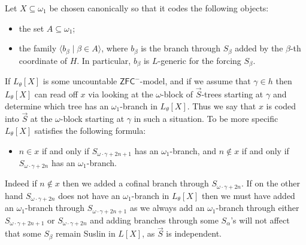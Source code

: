 \documentclass[a4paper,11pt]{article}
\newcommand{\ZFCminus}{\mathsf{ZFC}^{-}}
\begin{document}
Let $X\subseteq\omega_1$ be chosen canonically so that it codes the following
objects:
\begin{itemize}
   \item the set $A\subseteq\omega_1$;
   \item the family $\langle b_\beta\mid\beta\in A\rangle$, where $b_\beta$
         is the branch through $S_\beta$ added by the $\beta$-th coordinate
         of $H$.  In particular, $b_\beta$ is $L$-generic for the forcing
         $S_\beta$.
\end{itemize}

If $L_{\theta}[X]$ is some uncountable $\ZFCminus$-model, and if we assume that $\gamma \in h$ then
 $L_{\theta}[X]$ can read off $x$ via looking at the $\omega$-block of $\vec{S}$-trees starting at $\gamma$ and determine which tree has an $\omega_1$-branch in $L_{\theta}[X]$. Thus  we say that $x$ is coded into $\vec{S}$ at the $\omega$-block starting at $\gamma$ in such a situation. To be more specific $L_{\theta}[X]$ satisfies the following formula:
\begin{itemize}
 \item[$(\ast)_{\gamma, x}$]  $n \in x$ if and only if $S_{\omega \cdot \gamma +2n+1}$ has an $\omega_1$-branch, and $n \notin x$ if and only if $S_{\omega \cdot \gamma +2n}$ has an $\omega_1$-branch.
\end{itemize}
Indeed if $n \notin x$ then we added a cofinal branch through $S_{\omega \cdot \gamma+ 2n}$. If on the other hand $S_{\omega \cdot\gamma +2n}$ does not have an $\omega_1$-branch in $L_{\theta}[X]$ then we must have added an $\omega_1$-branch through $S_{\omega \cdot \gamma +2n+1}$ as we always add an $\omega_1$-branch through either $S_{\omega \cdot \gamma +2n+1}$ or $S_{\omega \cdot \gamma +2n}$ and adding branches through some $S_{\alpha}$'s  will not affect that some $S_{\beta}$ remain Suslin in $L[X]$, as $\vec{S}$ is independent.
\end{document}
